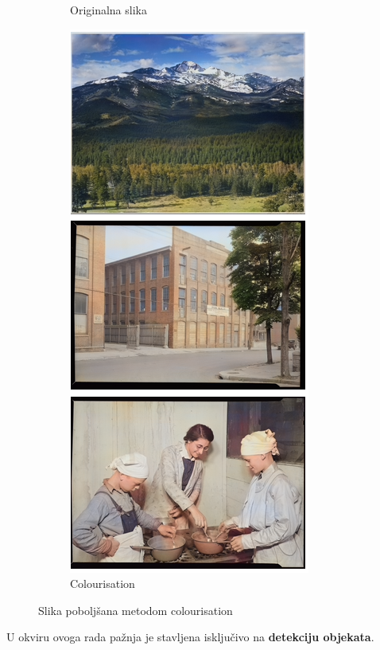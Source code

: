 \begin{enumerate}
\begin{figure}[H]
\begin{subfigure}[b]{0.4\linewidth}
		\caption{Originalna slika}
	\end{subfigure}
	\begin{subfigure}[b]{0.4\linewidth}
		\includegraphics[width=\linewidth]{img/Colourisation.png}
		\caption{Colourisation}
	\end{subfigure}
	\caption{Slika poboljšana metodom colourisation}
	\label{img:colourisation}
\end{figure}

\end{enumerate}

U okviru ovoga rada pažnja je stavljena isključivo na \textbf{detekciju objekata}.